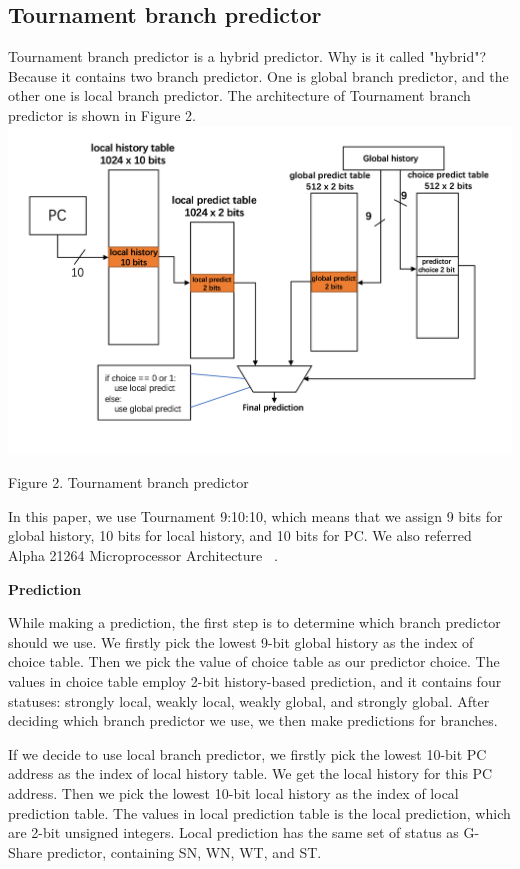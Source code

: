 \documentclass[conference]{IEEEtran}
\begin{document}
\subsection{Tournament branch predictor}
Tournament branch predictor is a hybrid predictor. Why is it called "hybrid"? Because it contains two branch predictor. One is global branch predictor, and the other one is local branch predictor. 
The architecture of Tournament branch predictor is shown in Figure 2. 
\includegraphics[width=\linewidth]{Tournament.png}
\begin{center}
  {\small Figure 2. Tournament branch predictor}
\end{center}
In this paper, we use Tournament 9:10:10, which means that we assign 9 bits for global history, 10 bits for local history, and 10 bits for PC. We also referred Alpha 21264 Microprocessor Architecture ~\cite{nicepaper5}.  

\begin{center}
  \textbf{Prediction}
\end{center}
While making a prediction, the first step is to determine which branch predictor should we use. We firstly pick the lowest 9-bit global history as the index of choice table. Then we pick the value of choice table as our predictor choice. 
The values in choice table employ 2-bit history-based prediction, and it contains four statuses: strongly local, weakly local, weakly global, and strongly global. After deciding which branch predictor we use, we then make predictions for branches. 

If we decide to use local branch predictor, we firstly pick the lowest 10-bit PC address as the index of local history table. 
We get the local history for this PC address. Then we pick the lowest 10-bit local history as the index of local prediction table. The values in local prediction table is the local prediction, which are 2-bit unsigned integers. 
Local prediction has the same set of status as G-Share predictor, containing SN, WN, WT, and ST. 
\end{document}
